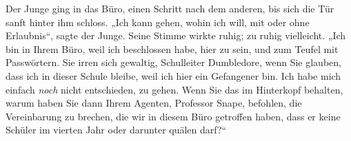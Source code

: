 Der Junge ging in das Büro, einen Schritt nach dem anderen, bis sich die Tür sanft hinter ihm schloss. „Ich kann gehen, wohin ich will, mit oder ohne Erlaubnis“, sagte der Junge. Seine Stimme wirkte ruhig; zu ruhig vielleicht. „Ich bin in Ihrem Büro, weil ich beschlossen habe, hier zu sein, und zum Teufel mit Passwörtern. Sie irren sich gewaltig, Schulleiter Dumbledore, wenn Sie glauben, dass ich in dieser Schule bleibe, weil ich hier ein Gefangener bin. Ich habe mich einfach \emph{noch} nicht entschieden, zu gehen. Wenn Sie das im Hinterkopf behalten, warum haben Sie dann Ihrem Agenten, Professor Snape, befohlen, die Vereinbarung zu brechen, die wir in diesem Büro getroffen haben, dass er keine Schüler im vierten Jahr oder darunter quälen darf?“

